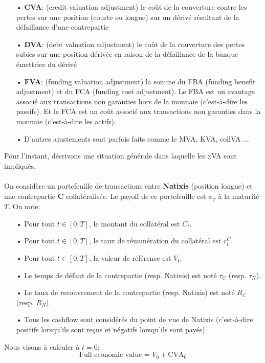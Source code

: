 \documentclass[a4paper,12pt]{report}
\numberwithin{equation}{section}
\theoremstyle{definition}
\numberwithin{equation}{section}
\begin{document}
\begin{itemize}
\item[•] \textbf{CVA}: (credit valuation adjustment) le coût de la couverture contre les pertes sur une position (courte ou longue) sur un dérivé résultant de la défaillance d'une contrepartie 
\item[•] \textbf{DVA}: (debt valuation adjustment) le coût de la couverture des pertes subies sur une position dérivée en raison de la défaillance de la banque émettrice du dérivé
\item[•] \textbf{FVA}: (funding valuation adjustment) la somme du FBA (funding benefit adjustment) et du FCA (funding cost adjustment). Le FBA est un avantage associé aux transactions non garanties hors de la monnaie (c'est-à-dire les passifs). Et le FCA est un coût associé aux transactions non garanties dans la monnaie (c'est-à-dire les actifs).
\item[•] D'autres ajustements sont parfois faits comme le MVA, KVA, collVA ...
\end{itemize}
\vspace*{0.3cm}
Pour l'instant, décrivons une situation générale dans laquelle les xVA sont impliqués.\\\\
On considère un portefeuille de transactions entre \textbf{Natixis} (position longue) et une contrepartie \textbf{C} collatéralisée. Le payoff de ce portefeuille est $\phi_T$ à la maturité $T$. On note:
\vspace*{0.3cm}
\begin{itemize}
\item[•] Pour tout $t\in [0,T]$, le montant du collatéral est $C_t$. 
\item[•] Pour tout $t\in [0,T]$, le taux de rémunération du collatéral est $r_t^C$.
\item[•] Pour tout $t\in [0,T]$, la valeur de référence est $V_t$.
\item[•] Le temps de défaut de la contrepartie (resp. Natixis) est noté $\tau_C$ (resp. $\tau_N$).
\item[•] Le taux de recouvrement de la contrepartie (resp. Natixis) est noté $R_C$ (resp. $R_N$). 
\item[•] Tous les cashflow sont considérés du point de vue de Natixis (c'est-à-dire positifs lorsqu'ils sont reçus et négatifs lorsqu'ils sont payés)
\end{itemize}
\vspace*{0.5cm}
Nous visons à calculer à $t=0$:
$$\mbox{Full economic value = }V_0+\mbox{CVA}_0$$
\end{document}
